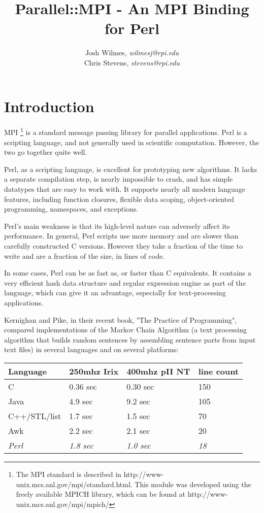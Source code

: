 \documentclass{report}
\title{Parallel::MPI - An MPI Binding for Perl}
\author{Josh Wilmes, \textit{wilmesj@rpi.edu}\\
	Chris Stevens, \textit{stevens@rpi.edu}
}
\begin{document}
\maketitle
\section*{Introduction}

MPI \footnote{The MPI standard is described in
http://www-unix.mcs.anl.gov/mpi/standard.html.  This module was
developed using the freely available MPICH library, which can be found 
at http://www-unix.mcs.anl.gov/mpi/mpich/} is a standard message
passing library for parallel applications.  Perl is a scripting
language, and not generally used in scientific computation.   However,
the two go together quite well.

Perl, as a scripting language, is excellent for prototyping new
algorithms.  It lacks a separate compilation step, is nearly
impossible to crash, and has simple datatypes that are easy to
work with.   It supports nearly all modern language features,
including function closures, flexible data scoping, object-oriented
programming, namespaces, and exceptions.

Perl's main weakness is that its high-level nature can 
adversely affect its performance.   In general, Perl scripts use more
memory and are slower than carefully constructed C versions.   However 
they take a fraction of the time to write and are a fraction of the
size, in lines of code.

In some cases, Perl can be as fast as, or faster than C equivalents.
It contains a very efficient hash data structure and regular
expression engine as part of the language, which can give it an
advantage, especially for text-processing applications.

Kernighan and Pike, in their recent book, "The Practice of
Programming", compared implementations of the Markov Chain Algorithm
(a text processing algorithm that builds random	sentences by
assembling sentence parts from input text files) in several languages
and on several platforms:

\begin{center}
\begin{tabular}{|l|l|l|l|}	
        \hline
     \bf{Language}     & \bf{250mhz Irix} & \bf{400mhz pII NT} & \bf{line count}\\ \hline
	C              & 0.36 sec      &  0.30 sec      & 150\\ \hline
	Java           & 4.9 sec       &  9.2 sec       & 105\\ \hline
	C++/STL/list   & 1.7 sec       &  1.5 sec       & 70\\ \hline
	Awk            & 2.2 sec       &  2.1 sec       & 20\\ \hline
\textit{Perl}        &\textit{1.8 sec} &\textit{1.0 sec} & \textit{18} \\ \hline
\end{tabular}
\end{center}
\end{document}
